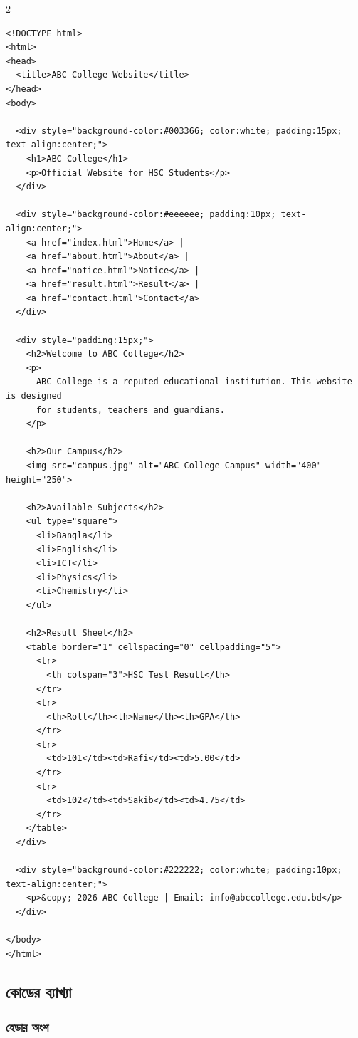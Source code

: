 \par{}\par
\begin{multicols}{2}
\begin{verbatim}
<!DOCTYPE html>
<html>
<head>
  <title>ABC College Website</title>
</head>
<body>

  <div style="background-color:#003366; color:white; padding:15px; text-align:center;">
    <h1>ABC College</h1>
    <p>Official Website for HSC Students</p>
  </div>

  <div style="background-color:#eeeeee; padding:10px; text-align:center;">
    <a href="index.html">Home</a> |
    <a href="about.html">About</a> |
    <a href="notice.html">Notice</a> |
    <a href="result.html">Result</a> |
    <a href="contact.html">Contact</a>
  </div>

  <div style="padding:15px;">
    <h2>Welcome to ABC College</h2>
    <p>
      ABC College is a reputed educational institution. This website is designed
      for students, teachers and guardians.
    </p>

    <h2>Our Campus</h2>
    <img src="campus.jpg" alt="ABC College Campus" width="400" height="250">

    <h2>Available Subjects</h2>
    <ul type="square">
      <li>Bangla</li>
      <li>English</li>
      <li>ICT</li>
      <li>Physics</li>
      <li>Chemistry</li>
    </ul>

    <h2>Result Sheet</h2>
    <table border="1" cellspacing="0" cellpadding="5">
      <tr>
        <th colspan="3">HSC Test Result</th>
      </tr>
      <tr>
        <th>Roll</th><th>Name</th><th>GPA</th>
      </tr>
      <tr>
        <td>101</td><td>Rafi</td><td>5.00</td>
      </tr>
      <tr>
        <td>102</td><td>Sakib</td><td>4.75</td>
      </tr>
    </table>
  </div>

  <div style="background-color:#222222; color:white; padding:10px; text-align:center;">
    <p>&copy; 2026 ABC College | Email: info@abccollege.edu.bd</p>
  </div>

</body>
</html>
\end{verbatim}
\end{multicols}


\subsection{কোডের ব্যাখ্যা}

\subsubsection{হেডার অংশ}

